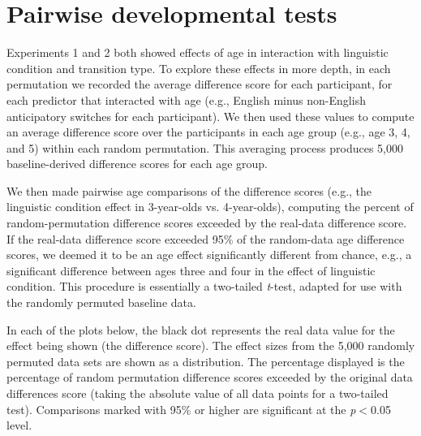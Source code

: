 \documentclass[authoryear, 12pt]{elsarticle}
\begin{document}




\section{Pairwise developmental tests}
\label{sec:pairwisedev}
\setcounter{figure}{0}
Experiments 1 and 2 both showed effects of age in interaction with linguistic condition and transition type. To explore these effects in more depth, in each permutation we recorded the average difference score for each participant, for each predictor that interacted with age (e.g., English minus non-English anticipatory switches for each participant). We then used these values to compute an average difference score over the participants in each age group (e.g., age 3, 4, and 5) within each random permutation. This averaging process produces 5,000 baseline-derived difference scores for each age group.

We then made pairwise age comparisons of the difference scores (e.g., the linguistic condition effect in 3-year-olds vs. 4-year-olds), computing the percent of random-permutation difference scores exceeded by the real-data difference score. If the real-data difference score exceeded 95\% of the random-data age difference scores, we deemed it to be an age effect significantly different from chance, e.g., a significant difference between ages three and four in the effect of linguistic condition. This procedure is essentially a two-tailed \textit{t}-test, adapted for use with the randomly permuted baseline data.

In each of the plots below, the black dot represents the real data value for the effect being shown (the difference score). The effect sizes from the 5,000 randomly permuted data sets are shown as a distribution. The percentage displayed is the percentage of random permutation difference scores exceeded by the original data differences score (taking the absolute value of all data points for a two-tailed test). Comparisons marked with 95\% or higher are significant at the \textit{p}$<$0.05 level.
\end{document}
